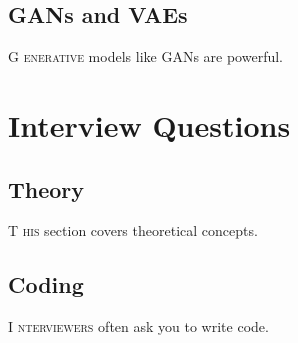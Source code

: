 \documentclass{book}
\begin{document}
\section{GANs and VAEs}
\lettrine{G}{ enerative} models like GANs are powerful. \lipsum[6]

\chapter{Interview Questions}

\section{Theory}
\lettrine{T}{ his} section covers theoretical concepts. \lipsum[7]

\section{Coding}
\lettrine{I}{ nterviewers} often ask you to write code. \lipsum[8]
\end{document}
